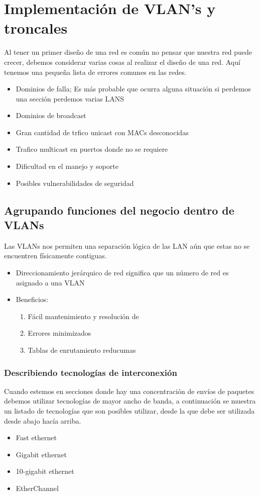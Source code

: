 \chapter{Implementación de VLAN's y troncales}
Al tener un primer diseño de una red es común no pensar que nuestra red puede crecer, debemos considerar varias cosas al realizar el diseño de una red. 
Aquí tenemos una pequeña lista de errores comunes en las redes.
\begin{itemize}
    \item Dominios de falla; Es más probable que ocurra alguna situación si perdemos una sección perdemos varias LANS 
    \item Dominios de broadcast
    \item Gran cantidad de trfico unicast con MACs desconocidas
    \item Trafico multicast en puertos donde no se requiere 
    \item Dificultad en el manejo y soporte
    \item Posibles vulnerabilidades de seguridad
\end{itemize}

\section{Agrupando funciones del negocio dentro de VLANs}
Las VLANs nos permiten una separación lógica de las LAN aún que estas no se encuentren físicamente contiguas. 

\begin{itemize}
    \item {Direccionamiento jerárquico de red significa que un número de red es asignado a una VLAN}
    \item {Beneficios: 
        \begin{enumerate}
            \item {Fácil mantenimiento y resolución de}
            \item {Errores minimizados}
            \item {Tablas de enrutamiento reducumas}
        \end{enumerate}}
\end{itemize}

\subsection{Describiendo tecnologías de interconexión}
Cuando estemos en secciones donde hay una concentración de envíos de paquetes debemos utilizar tecnologías de mayor ancho de banda, a continuación se muestra un listado de tecnologías que son posibles utilizar, desde la que debe ser utilizada desde abajo hacía arriba.
\begin{itemize}
    \item Fast ethernet
    \item Gigabit ethernet
    \item 10-gigabit ethernet
    \item EtherChannel
\end{itemize}


